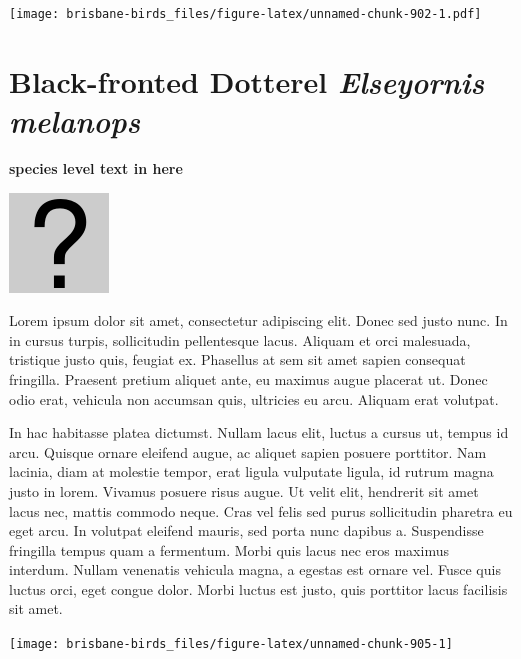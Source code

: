 \documentclass[]{book}
\let\origfigure\figure
\let\endorigfigure\endfigure
\renewenvironment{figure}[1][2] {
  \expandafter\origfigure\expandafter[H]
} {
  \endorigfigure
}
\begin{document}
\begin{figure}
\centering
\texttt{[image: brisbane-birds\_files/figure-latex/unnamed-chunk-902-1.pdf]}
\caption{\label{fig:unnamed-chunk-902}insert figure caption}
\end{figure}

\section{\texorpdfstring{Black-fronted Dotterel \emph{Elseyornis
melanops}}{Black-fronted Dotterel Elseyornis melanops}}\label{black-fronted-dotterel-elseyornis-melanops}

\textbf{species level text in here}

\begin{figure}
\centering
\includegraphics{assets/missing.png}
\caption{No image for species}
\end{figure}

Lorem ipsum dolor sit amet, consectetur adipiscing elit. Donec sed justo
nunc. In in cursus turpis, sollicitudin pellentesque lacus. Aliquam et
orci malesuada, tristique justo quis, feugiat ex. Phasellus at sem sit
amet sapien consequat fringilla. Praesent pretium aliquet ante, eu
maximus augue placerat ut. Donec odio erat, vehicula non accumsan quis,
ultricies eu arcu. Aliquam erat volutpat.

In hac habitasse platea dictumst. Nullam lacus elit, luctus a cursus ut,
tempus id arcu. Quisque ornare eleifend augue, ac aliquet sapien posuere
porttitor. Nam lacinia, diam at molestie tempor, erat ligula vulputate
ligula, id rutrum magna justo in lorem. Vivamus posuere risus augue. Ut
velit elit, hendrerit sit amet lacus nec, mattis commodo neque. Cras vel
felis sed purus sollicitudin pharetra eu eget arcu. In volutpat eleifend
mauris, sed porta nunc dapibus a. Suspendisse fringilla tempus quam a
fermentum. Morbi quis lacus nec eros maximus interdum. Nullam venenatis
vehicula magna, a egestas est ornare vel. Fusce quis luctus orci, eget
congue dolor. Morbi luctus est justo, quis porttitor lacus facilisis sit
amet.

\begin{figure}
\texttt{[image: brisbane-birds\_files/figure-latex/unnamed-chunk-905-1]} \caption{insert figure caption}\label{fig:unnamed-chunk-905}
\end{figure}
\end{document}

